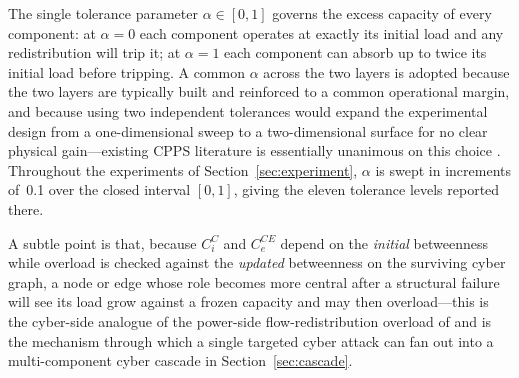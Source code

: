 The single tolerance parameter $\alpha\in[0,1]$ governs the excess
capacity of every component: at $\alpha=0$ each component operates
at exactly its initial load and any redistribution will trip it;
at $\alpha=1$ each component can absorb up to twice its initial
load before tripping.  A common $\alpha$ across the two layers is
adopted because the two layers are typically built and reinforced
to a common operational margin, and because using two independent
tolerances would expand the experimental design from a one-dimensional
sweep to a two-dimensional surface for no clear physical
gain---existing CPPS literature is essentially unanimous on this
choice \citep{Motter2002,Buldyrev2010,Cai2016TSG}.  Throughout the
experiments of Section~\ref{sec:experiment}, $\alpha$ is swept in
increments of~0.1 over the closed interval $[0,1]$, giving the
eleven tolerance levels reported there.

A subtle point is that, because $C_i^{C}$ and $C_e^{CE}$ depend on
the \emph{initial} betweenness while overload is checked against
the \emph{updated} betweenness on the surviving cyber graph, a node
or edge whose role becomes more central after a structural failure
will see its load grow against a frozen capacity and may then
overload---this is the cyber-side analogue of the power-side
flow-redistribution overload of \citet{Motter2002} and is the
mechanism through which a single targeted cyber attack can fan out
into a multi-component cyber cascade in Section~\ref{sec:cascade}.


